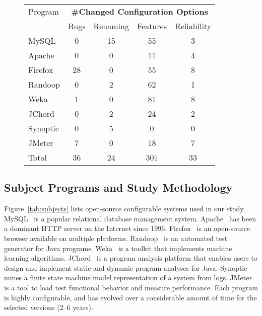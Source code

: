 \begin{figure}[t]
\vspace{1mm}
\centering
\small{
\setlength{\tabcolsep}{.50\tabcolsep}
\begin{tabular}{|l|c|c|c|c|}
\hline
 Program & \multicolumn{4}{|c|}{\textbf{\#Changed Configuration Options}} \\
 \cline{2-5}
 & Bugs & Renaming & Features & Reliability \\
 \hline
 \hline
 MySQL & 0 & 15 & 55 & 3 \\
 Apache& 0 & 0 & 11 & 4 \\
 Firefox& 28 & 0 & 55 & 8 \\
 Randoop & 0  & 2 & 62  & 1\\
 Weka & 1  & 0 & 81  & 8 \\
 JChord & 0  & 2 & 24 & 2\\ %
 Synoptic & 0 &  5 & 0 & 0\\
 JMeter & 7  & 0 & 18 & 7 \\
\hline
\hline
 Total & 36 & 24 & 301 & 33 \\
\hline
\end{tabular}
}
\vspace{-2mm}
\end{figure}


\subsection{Subject Programs and Study Methodology}


Figure~\ref{tab:subjects} lists
\studysubjnum open-source configurable systems used in our
study.
MySQL~\cite{mysql}  is a popular relational database management
system. Apache~\cite{apache} has been a dominant
HTTP server on the Internet since 1996. Firefox~\cite{firefox}
is an open-source browser available on multiple platforms.
Randoop~\cite{randoop} is an automated test generator for Java
programs. Weka~\cite{weka} is a toolkit that implements machine
learning algorithms. JChord~\cite{jchord} is a program analysis platform that
enables users to design and implement static and
dynamic program analyses for Java. Synoptic~\cite{synoptic} mines a
finite state machine model representation of a system from
logs. JMeter~\cite{jmeter} is a tool to load test functional
behavior and measure performance.
Each program is highly configurable, and has evolved over
a considerable amount of time for the selected versions ({2--6} years).


